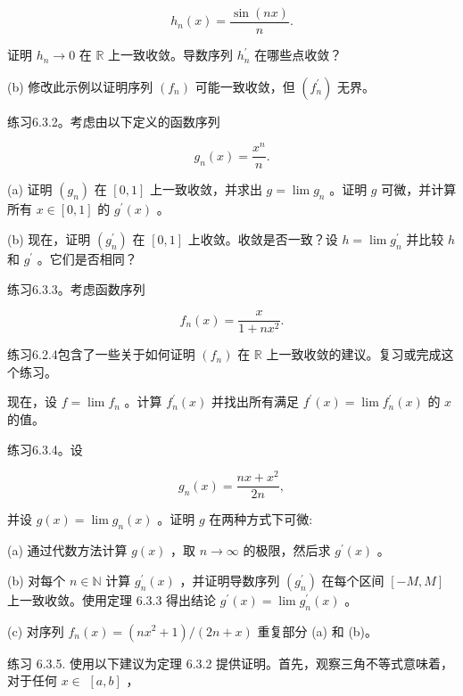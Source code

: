\[
{h}_{n}\left( x\right)  = \frac{\sin \left( {nx}\right) }{n}.
\]

证明 \({h}_{n} \rightarrow  0\) 在 \(\mathbb{R}\) 上一致收敛。导数序列 \({h}_{n}^{\prime }\) 在哪些点收敛？

(b) 修改此示例以证明序列 \(\left( {f}_{n}\right)\) 可能一致收敛，但 \(\left( {f}_{n}^{\prime }\right)\) 无界。

练习6.3.2。考虑由以下定义的函数序列

\[
{g}_{n}\left( x\right)  = \frac{{x}^{n}}{n}.
\]

(a) 证明 \(\left( {g}_{n}\right)\) 在 \(\left\lbrack  {0,1}\right\rbrack\) 上一致收敛，并求出 \(g = \lim {g}_{n}\) 。证明 \(g\) 可微，并计算所有 \(x \in  \left\lbrack  {0,1}\right\rbrack\) 的 \({g}^{\prime }\left( x\right)\) 。

(b) 现在，证明 \(\left( {g}_{n}^{\prime }\right)\) 在 \(\left\lbrack  {0,1}\right\rbrack\) 上收敛。收敛是否一致？设 \(h = \lim {g}_{n}^{\prime }\) 并比较 \(h\) 和 \({g}^{\prime }\) 。它们是否相同？

练习6.3.3。考虑函数序列

\[
{f}_{n}\left( x\right)  = \frac{x}{1 + n{x}^{2}}.
\]

练习6.2.4包含了一些关于如何证明 \(\left( {f}_{n}\right)\) 在 \(\mathbb{R}\) 上一致收敛的建议。复习或完成这个练习。

现在，设 \(f = \lim {f}_{n}\) 。计算 \({f}_{n}^{\prime }\left( x\right)\) 并找出所有满足 \({f}^{\prime }\left( x\right)  = \lim {f}_{n}^{\prime }\left( x\right)\) 的 \(x\) 的值。

练习6.3.4。设

\[
{g}_{n}\left( x\right)  = \frac{{nx} + {x}^{2}}{2n},
\]

并设 \(g\left( x\right)  = \lim {g}_{n}\left( x\right)\) 。证明 \(g\) 在两种方式下可微:

(a) 通过代数方法计算 \(g\left( x\right)\) ，取 \(n \rightarrow  \infty\) 的极限，然后求 \({g}^{\prime }\left( x\right)\) 。

(b) 对每个 \(n \in  \mathbb{N}\) 计算 \({g}_{n}^{\prime }\left( x\right)\) ，并证明导数序列 \(\left( {g}_{n}^{\prime }\right)\) 在每个区间 \(\left\lbrack  {-M,M}\right\rbrack\) 上一致收敛。使用定理 6.3.3 得出结论 \({g}^{\prime }\left( x\right)  = \lim {g}_{n}^{\prime }\left( x\right)\) 。

(c) 对序列 \({f}_{n}\left( x\right)  = \left( {n{x}^{2} + 1}\right) /\left( {{2n} + x}\right)\) 重复部分 (a) 和 (b)。

练习 6.3.5. 使用以下建议为定理 6.3.2 提供证明。首先，观察三角不等式意味着，对于任何 \(x \in\)  \(\left\lbrack  {a,b}\right\rbrack\) ，

